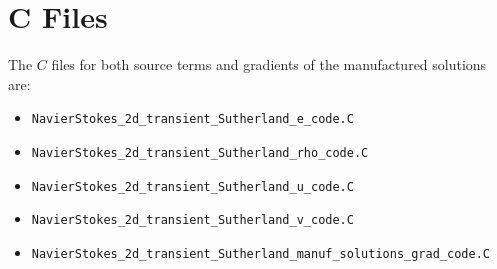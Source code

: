 \documentclass[10pt]{article}
\begin{document}
\section{C Files}
The $C$ files for both source terms and gradients of the  manufactured solutions are:
\begin{itemize}
 \item \texttt{NavierStokes\_2d\_transient\_Sutherland\_e\_code.C} \vspace{-6pt}
 \item \texttt{NavierStokes\_2d\_transient\_Sutherland\_rho\_code.C}\vspace{-6pt}
 \item \texttt{NavierStokes\_2d\_transient\_Sutherland\_u\_code.C}\vspace{-6pt}
 \item \texttt{NavierStokes\_2d\_transient\_Sutherland\_v\_code.C}\vspace{-6pt}
 \item \texttt{NavierStokes\_2d\_transient\_Sutherland\_manuf\_solutions\_grad\_code.C}
\end{itemize}








 

 
 
%

\end{document}

